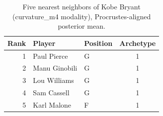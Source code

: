 \begin{table}[htbp]
  \centering\small
  \begin{tabular}{rllc}
    \toprule
    Rank & Player & Position & Archetype \\
    \midrule
    1 & Paul Pierce & G & 1 \\
    2 & Manu Ginobili & G & 1 \\
    3 & Lou Williams & G & 1 \\
    4 & Sam Cassell & G & 1 \\
    5 & Karl Malone & F & 1 \\
    \bottomrule
  \end{tabular}
  \caption{Five nearest neighbors of Kobe Bryant (curvature_m4 modality), Procrustes-aligned posterior mean.}
  \label{tab:Kobe_Bryant_neighbors_curvature_m4}
\end{table}

